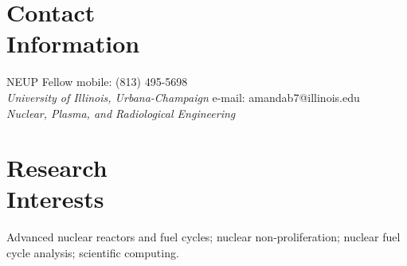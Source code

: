 \documentclass[margin,line]{resume}
\begin{document}
\begin{resume}



    \section{\mysidestyle Contact\\Information}
    NEUP Fellow \hfill mobile: (813) 495-5698 \vspace{0mm}\\\vspace{0mm}%
    \textsl{University of Illinois, Urbana-Champaign} \hfill e-mail: amandab7@illinois.edu \vspace{0mm}\\\vspace{0mm}%
        \textsl{Nuclear, Plasma, and Radiological Engineering}
    \vspace{0mm}\\\vspace{-4.5mm}%

    \section{\mysidestyle Research\\Interests}
                Advanced nuclear reactors and fuel cycles; 
                nuclear non-proliferation;
                nuclear fuel cycle analysis;
                scientific computing.

\end{resume}
\end{document}
